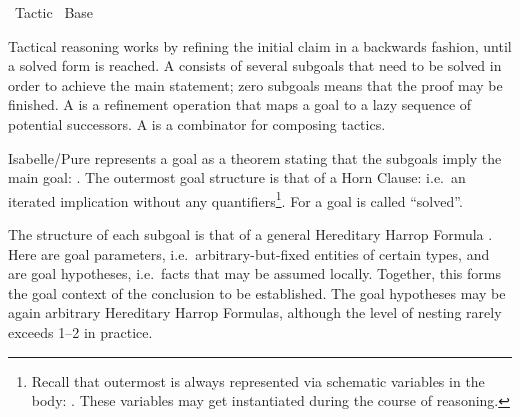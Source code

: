 %
\begin{isabellebody}%
\def\isabellecontext{Tactic}%
%
\isadelimtheory
%
\endisadelimtheory
%
\isatagtheory
{}\isamarkupfalse%
\ Tactic\isanewline
{}\ Base\isanewline
{}%
\endisatagtheory
{\isafoldtheory}%
%
\isadelimtheory
%
\endisadelimtheory
%
\isamarkuptrue%
%
\begin{isamarkuptext}%
Tactical reasoning works by refining the initial claim in a
  backwards fashion, until a solved form is reached.  A 
  consists of several subgoals that need to be solved in order to
  achieve the main statement; zero subgoals means that the proof may
  be finished.  A  is a refinement operation that maps
  a goal to a lazy sequence of potential successors.  A  is a combinator for composing tactics.%
\end{isamarkuptext}%
\isamarkuptrue%
%
\isamarkuptrue%
%
\begin{isamarkuptext}%
Isabelle/Pure represents a goal as a theorem stating that the
  subgoals imply the main goal: .  The outermost goal structure is that of a Horn Clause: i.e.\
  an iterated implication without any quantifiers\footnote{Recall that
  outermost  is always represented via schematic
  variables in the body: \isa{{\isasymphi}{\isacharbrackleft}{\isacharquery}x{\isacharbrackright}}.  These variables may get
  instantiated during the course of reasoning.}.  For \isa{n\ {\isacharequal}\ {\isadigit{0}}}
  a goal is called ``solved''.

  The structure of each subgoal  is that of a
  general Hereditary Harrop Formula .  Here  are goal parameters, i.e.\
  arbitrary-but-fixed entities of certain types, and  are goal hypotheses, i.e.\ facts that may
  be assumed locally.  Together, this forms the goal context of the
  conclusion \isa{B} to be established.  The goal hypotheses may be
  again arbitrary Hereditary Harrop Formulas, although the level of
  nesting rarely exceeds 1--2 in practice.


\end{isamarkuptext}
\end{isabellebody}
